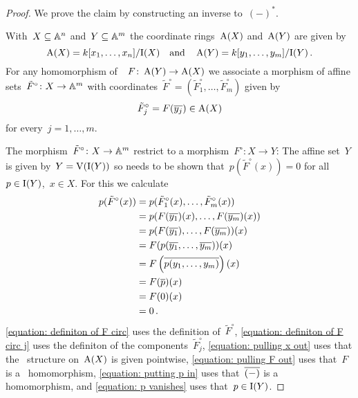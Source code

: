\begin{proof}
  We prove the claim by constructing an inverse to~$(-)^*$.
  
  With~$X \subseteq \mathbb{A}^n$ and~$Y \subseteq \mathbb{A}^m$ the coordinate rings~$\operatorname{A}(X)$ and~$\operatorname{A}(Y)$ are given by
  \[
      \operatorname{A}(X)
    = k[x_1, \dotsc, x_n]/{\operatorname{I}(X)}
    \quad\text{and}\quad
      \operatorname{A}(Y)
    = k[y_1, \dotsc, y_m]/{\operatorname{I}(Y)} \,.
  \]
  For any homomorphism of~~$F \colon \operatorname{A}(Y) \to \operatorname{A}(X)$ we associate a morphism of affine sets~$\tilde{F}^\circ \colon X \to \mathbb{A}^m$ with coordinates~$\tilde{F}^\circ = (\tilde{F}^\circ_1, \dotsc, \tilde{F}^\circ_m)$ given by
  \[
        \tilde{F}^\circ_j
    =   F(\overline{y_j})
    \in \operatorname{A}(X)
  \]
  for every~$j = 1, \dotsc, m$.
  
  The morphism~$\tilde{F}^\circ \colon X \to \mathbb{A}^m$ restrict to a morphism~$F^\circ \colon X \to Y$:
  The affine set~$Y$ is given by~$Y = \operatorname{V}(\operatorname{I}(Y))$ so needs to be shown that~$p( \tilde{F}^\circ(x) ) = 0$ for all~$p \in \operatorname{I}(Y)$,~$x \in X$.
  For this we calculate
  \begin{align}
        p(\tilde{F}^\circ(x))
    &=  p( \tilde{F}^\circ_1(x), \dotsc, \tilde{F}^\circ_m(x) )
        \label{equation: definiton of F circ} \\
    &=  p( F(\overline{y_1})(x), \dotsc, F(\overline{y_m})(x) )
        \label{equation: definiton of F circ j} \\
    &=  p( F(\overline{y_1}), \dotsc, F(\overline{y_m}) )(x)
        \label{equation: pulling x out} \\
    &=  F( p(\overline{y_1}, \dotsc, \overline{y_m}) )(x)
        \label{equation: pulling F out} \\
    &=  F\left( \overline{p(y_1, \dotsc, y_m)} \right)(x)
        \label{equation: putting p in}\\
    &=  F(\overline{p})(x)
        \nonumber \\
    &=  F(0)(x)
        \label{equation: p vanishes}  \\
    &=  0
        \nonumber \,.
  \end{align}
  \cref{equation: definiton of F circ} uses the definition of~$\tilde{F}^\circ$, \cref{equation: definiton of F circ j} uses the definiton of the components~$\tilde{F}^\circ_j$, \cref{equation: pulling x out} uses that the~ structure on~$\operatorname{A}(X)$ is given pointwise, \cref{equation: pulling F out} uses that~$F$ is a~ homomorphism, \cref{equation: putting p in} uses that~$\overline{(-)}$ is a~ homomorphism, and \cref{equation: p vanishes} uses that~$p \in \operatorname{I}(Y)$.
  

\end{proof}
